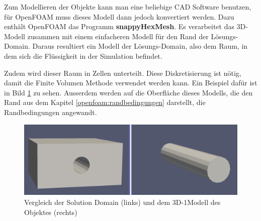 Zum Modellieren der Objekte kann man eine beliebige CAD Software benutzen, für OpenFOAM muss dieses Modell dann jedoch konvertiert werden.
Dazu enthält OpenFOAM das Programm \textbf{snappyHexMesh}.
Es verarbeitet das 3D-Modell zusammen mit einem einfacheren Modell für den Rand der Lösungs-Domain. 
Daraus resultiert ein Modell der Lösungs-Domain, also dem Raum, in dem sich die Flüssigkeit in der Simulation befindet.

Zudem wird dieser Raum in Zellen unterteilt.
Diese Diskretisierung ist nötig, damit die Finite Volumen Methode verwendet werden kann.
Ein Beispiel dafür ist in Bild \ref{openfoam:fig:SD_Modell_vergleich} zu sehen.
Ausserdem werden auf die Oberfläche dieses Modells, die den Rand aus dem Kapitel \ref{openfoam:randbedingungen} darstellt, die Randbedingungen angewandt.
\begin{figure}
	\centering
	\includegraphics[scale=0.1]{papers/openfoam/Bilder/vergleich_solution_domain_object.png}
	\caption{Vergleich der Solution Domain (links) und dem 3D-1Modell des Objektes (rechts)}
	\label{openfoam:fig:SD_Modell_vergleich}
\end{figure}

